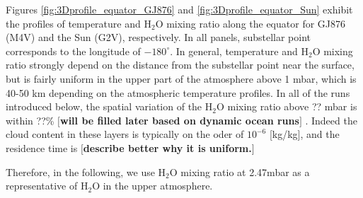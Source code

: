 \documentclass[11pt,numberedappendix,twocolappendix,]{emulateapj}
\def\water{H$_2$O }
\def\preslevel{2.47}
\def\memo#1{\color{red}$[${\bf #1}$]$ \color{black}}
\begin{document}
Figures \ref{fig:3Dprofile_equator_GJ876} and \ref{fig:3Dprofile_equator_Sun} exhibit the profiles of temperature and \water mixing ratio along the equator  for GJ876 (M4V) and the Sun (G2V), respectively.  
In all panels, substellar point corresponds to the longitude of $-180^{\circ }$. 
In general, temperature and \water mixing ratio strongly depend on the distance from the substellar point near the surface, but is fairly uniform in the upper part of the atmosphere above 1 mbar, which is 40-50 km depending on the atmospheric temperature profiles. 
In all of the runs introduced below, the spatial variation of the \water mixing ratio above ?? mbar is within ??\% \memo{will be filled later based on dynamic ocean runs}. 
Indeed the cloud content in these layers is typically on the oder of $10^{-6} $ [kg/kg], and the residence time is \memo{describe better why it is uniform.}

Therefore, in the following, we use \water mixing ratio at \preslevel mbar as a representative of \water in the upper atmosphere. 
\end{document}

